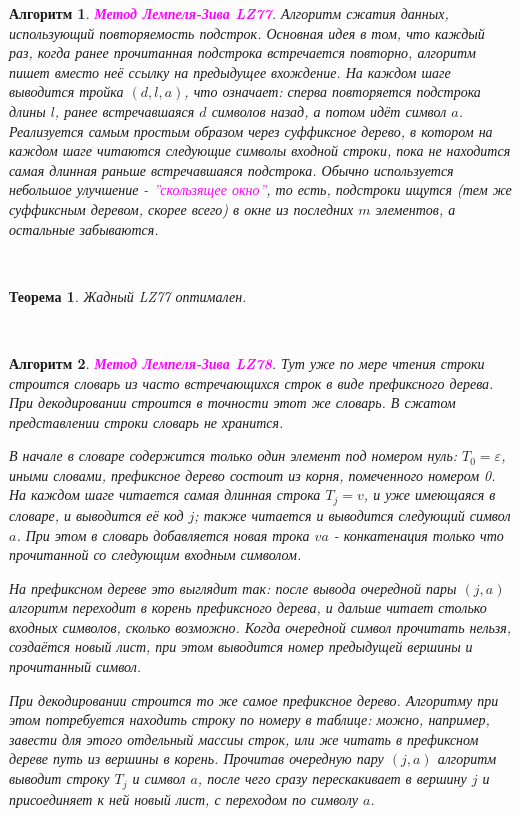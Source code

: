 \documentclass[a4paper]{article}
\theoremstyle{indented}
\newtheorem{theorem}{Теорема}
\newtheorem{alg}{Алгоритм}
\theoremstyle{definition}
\theoremstyle{remark}
\begin{document}
\begin{alg}
    \textcolor{magenta}{\hypertarget{t35}{\textbf{Метод Лемпеля-Зива LZ77}}}. Алгоритм сжатия данных, использующий повторяемость подстрок. Основная идея в том, что каждый раз, когда ранее прочитанная подстрока встречается повторно, алгоритм пишет вместо неё ссылку на предыдущее вхождение. На каждом шаге выводится тройка $(d, l, a)$, что означает: сперва повторяется подстрока длины $l$, ранее встречавшаяся $d$ символов назад, а потом идёт символ $a$. Реализуется самым простым образом через суффиксное дерево, в котором на каждом шаге читаются следующие символы входной строки, пока не находится самая длинная раньше встречавшаяся подстрока. Обычно используется небольшое улучшение - \textcolor{magenta}{\hypertarget{d27}{\textit{''скользящее окно''}}}, то есть, подстроки ищутся (тем же суффиксным деревом, скорее всего) в окне из последних $m$ элементов, а остальные забываются.
\end{alg} \ 

\begin{theorem}
    Жадный LZ77 оптимален.
\end{theorem} \ 

\begin{alg}
    \textcolor{magenta}{\hypertarget{t36}{\textbf{Метод Лемпеля-Зива LZ78}}}. Тут уже по мере чтения строки строится словарь из часто встречающихся строк в виде префиксного дерева. При декодировании строится в точности этот же словарь. В сжатом представлении строки словарь не хранится. \ 

    В начале в словаре содержится только один элемент под номером нуль: $T_0=\varepsilon$, иными словами, префиксное дерево состоит из корня, помеченного номером 0. На каждом шаге читается самая длинная строка $T_j=v$, и уже имеющаяся в словаре, и выводится её код $j$; также читается и выводится следующий символ $a$. При этом в словарь добавляется новая трока $va$ - конкатенация только что прочитанной со следующим входным символом. \ 

    На префиксном дереве это выглядит так: после вывода очередной пары $(j, a)$ алгоритм переходит в корень префиксного дерева, и дальше читает столько входных символов, сколько возможно. Когда очередной символ прочитать нельзя, создаётся новый лист, при этом выводится номер предыдущей вершины и прочитанный символ. \ 

    При декодировании строится то же самое префиксное дерево. Алгоритму при этом потребуется находить строку по номеру в таблице: можно, например, завести для этого отдельный массиы строк, или же читать в префиксном дереве путь из вершины в корень. Прочитав очередную пару $(j, a)$ алгоритм выводит строку $T_j$ и символ $a$, после чего сразу перескакивает в вершину $j$ и присоединяет к ней новый лист, с переходом по символу $a$. 
\end{alg} \ 
\end{document}
